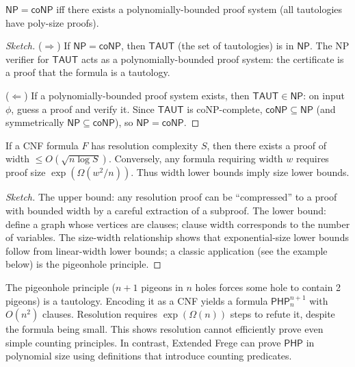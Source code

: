 \begin{theorem}
$\mathsf{NP} = \mathsf{coNP}$ iff there exists a polynomially-bounded proof system (all tautologies have poly-size proofs).
\end{theorem}

\begin{proof}[Sketch]
($\Rightarrow$) If $\mathsf{NP} = \mathsf{coNP}$, then $\mathsf{TAUT}$ (the set of tautologies) is in $\mathsf{NP}$. The NP verifier for $\mathsf{TAUT}$ acts as a polynomially-bounded proof system: the certificate is a proof that the formula is a tautology.

($\Leftarrow$) If a polynomially-bounded proof system exists, then $\mathsf{TAUT} \in \mathsf{NP}$: on input $\phi$, guess a proof and verify it. Since $\mathsf{TAUT}$ is coNP-complete, $\mathsf{coNP} \subseteq \mathsf{NP}$ (and symmetrically $\mathsf{NP} \subseteq \mathsf{coNP}$), so $\mathsf{NP} = \mathsf{coNP}$.
\end{proof}

\begin{theorem}
If a CNF formula $F$ has resolution complexity $S$, then there exists a proof of width $\le O(\sqrt{n \log S})$. Conversely, any formula requiring width $w$ requires proof size $\exp(\Omega(w^2/n))$. Thus width lower bounds imply size lower bounds.
\end{theorem}

\begin{proof}[Sketch]
The upper bound: any resolution proof can be ``compressed'' to a proof with bounded width by a careful extraction of a subproof. The lower bound: define a graph whose vertices are clauses; clause width corresponds to the number of variables. The size-width relationship shows that exponential-size lower bounds follow from linear-width lower bounds; a classic application (see the example below) is the pigeonhole principle.
\end{proof}

\begin{example}
The pigeonhole principle ($n+1$ pigeons in $n$ holes forces some hole to contain 2 pigeons) is a tautology. Encoding it as a CNF yields a formula $\mathsf{PHP}_n^{n+1}$ with $O(n^2)$ clauses. Resolution requires $\exp(\Omega(n))$ steps to refute it, despite the formula being small. This shows resolution cannot efficiently prove even simple counting principles. In contrast, Extended Frege can prove $\mathsf{PHP}$ in polynomial size using definitions that introduce counting predicates.
\end{example}

